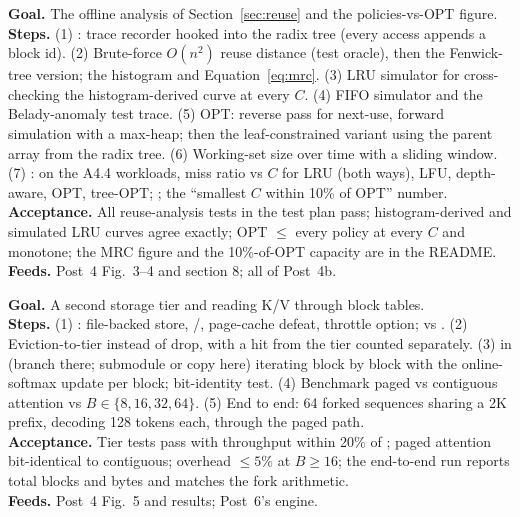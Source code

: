 \textbf{Goal.} The offline analysis of Section~\ref{sec:reuse} and the policies-vs-OPT figure.\\
\textbf{Steps.} (1) : trace recorder hooked into the radix tree (every access appends a block id). (2) Brute-force $O(n^2)$ reuse distance (test oracle), then the Fenwick-tree version; the histogram and Equation~\eqref{eq:mrc}. (3) LRU simulator for cross-checking the histogram-derived curve at every $C$. (4) FIFO simulator and the Belady-anomaly test trace. (5) OPT: reverse pass for next-use, forward simulation with a max-heap; then the leaf-constrained variant using the parent array from the radix tree. (6) Working-set size over time with a sliding window. (7) : on the A4.4 workloads, miss ratio vs $C$ for LRU (both ways), LFU, depth-aware, OPT, tree-OPT; ; the ``smallest $C$ within 10\% of OPT'' number.\\
\textbf{Acceptance.} All reuse-analysis tests in the test plan pass; histogram-derived and simulated LRU curves agree exactly; OPT $\le$ every policy at every $C$ and monotone; the MRC figure and the 10\%-of-OPT capacity are in the README.\\
\textbf{Feeds.} Post~4 Fig.~3--4 and section 8; all of Post~4b.

\textbf{Goal.} A second storage tier and  reading K/V through block tables.\\
\textbf{Steps.} (1) : file-backed store, /, page-cache defeat, throttle option;  vs . (2) Eviction-to-tier instead of drop, with a hit from the tier counted separately. (3)  in  (branch there; submodule or copy here) iterating block by block with the online-softmax update per block; bit-identity test. (4) Benchmark paged vs contiguous attention vs $B\in\{8,16,32,64\}$. (5) End to end: 64 forked sequences sharing a 2K prefix, decoding 128 tokens each, through the paged path.\\
\textbf{Acceptance.} Tier tests pass with throughput within 20\% of ; paged attention bit-identical to contiguous; overhead $\le 5\%$ at $B \ge 16$; the end-to-end run reports total blocks and bytes and matches the fork arithmetic.\\
\textbf{Feeds.} Post~4 Fig.~5 and results; Post~6's engine.


